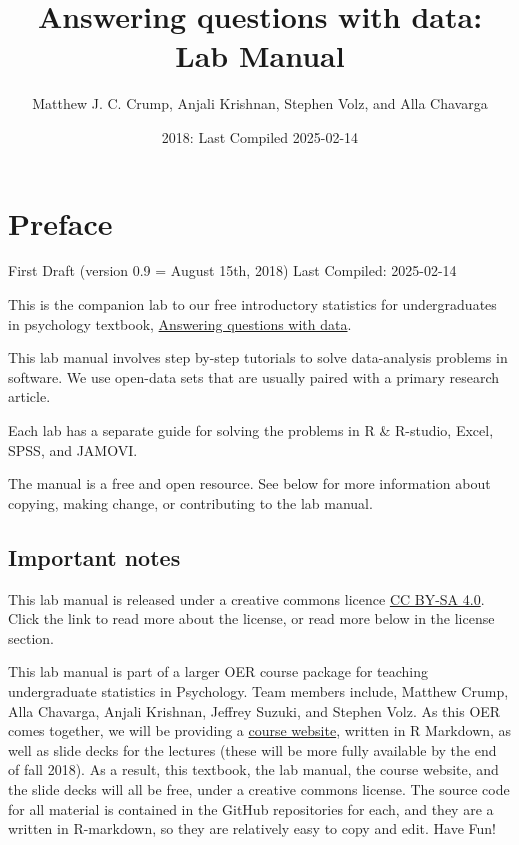 \documentclass[
]{book}
\title{Answering questions with data: Lab Manual}
\author{Matthew J. C. Crump, Anjali Krishnan, Stephen Volz, and Alla Chavarga}
\date{2018: Last Compiled 2025-02-14}
\begin{document}
\maketitle

{
\setcounter{tocdepth}{1}
\tableofcontents
}
\hypertarget{preface}{%
\chapter*{Preface}\label{preface}}

First Draft (version 0.9 = August 15th, 2018)
Last Compiled: 2025-02-14

This is the companion lab to our free introductory statistics for undergraduates in psychology textbook, \href{https://crumplab.github.io/statistics/}{Answering questions with data}.

This lab manual involves step by-step tutorials to solve data-analysis problems in software. We use open-data sets that are usually paired with a primary research article.

Each lab has a separate guide for solving the problems in R \& R-studio, Excel, SPSS, and JAMOVI.

The manual is a free and open resource. See below for more information about copying, making change, or contributing to the lab manual.

\hypertarget{important-notes}{%
\section{Important notes}\label{important-notes}}

This lab manual is released under a creative commons licence \href{https://creativecommons.org/licenses/by-sa/4.0/}{CC BY-SA 4.0}. Click the link to read more about the license, or read more below in the license section.

This lab manual is part of a larger OER course package for teaching undergraduate statistics in Psychology. Team members include, Matthew Crump, Alla Chavarga, Anjali Krishnan, Jeffrey Suzuki, and Stephen Volz. As this OER comes together, we will be providing a \href{https://crumplab.github.io/psyc3400/}{course website}, written in R Markdown, as well as slide decks for the lectures (these will be more fully available by the end of fall 2018). As a result, this textbook, the lab manual, the course website, and the slide decks will all be free, under a creative commons license. The source code for all material is contained in the GitHub repositories for each, and they are a written in R-markdown, so they are relatively easy to copy and edit. Have Fun!
\end{document}
